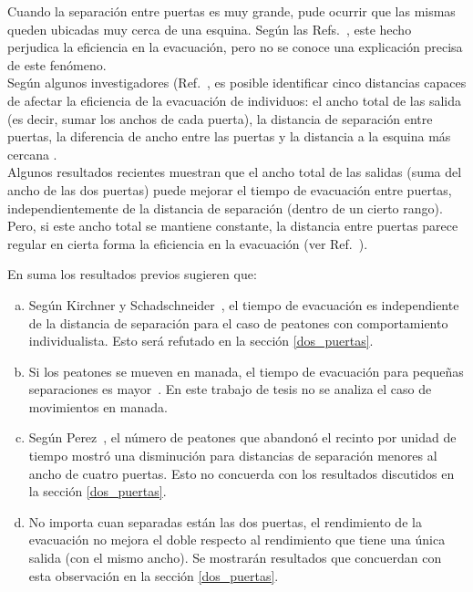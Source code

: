 Cuando la separación entre puertas es muy grande, pude ocurrir que las mismas queden ubicadas muy cerca de una esquina. Según las 
Refs.~\cite{kirchner1,daoliang1}, este hecho perjudica la eficiencia 
en la evacuación, pero no se conoce una explicación precisa de este 
fenómeno.\\

\noindent Según algunos investigadores (Ref.~\cite{huanhuan1}, es posible identificar cinco distancias capaces de afectar la eficiencia de la evacuación de individuos: el ancho total de las salida (es decir, sumar los anchos de cada puerta), la distancia de separación entre puertas, la diferencia de ancho entre las puertas y la distancia a la esquina más cercana \cite{huanhuan1}. \\

Algunos resultados recientes muestran que el ancho total de las salidas (suma del ancho de las dos puertas) puede mejorar el tiempo de evacuación entre puertas, independientemente de la distancia de separación (dentro de un cierto rango). Pero, si este ancho total se mantiene constante, la distancia entre puertas parece regular en cierta forma la eficiencia en la evacuación (ver Ref.~\cite{huanhuan1}).


En suma los resultados previos sugieren que:

\begin{enumerate}[(a)]

\item Según Kirchner y Schadschneider~\cite{kirchner1}, el tiempo de evacuación es independiente de la distancia de separación para el caso de peatones con comportamiento individualista. Esto será refutado en la sección \ref{dos_puertas}.

\item Si los peatones se mueven en manada, el tiempo de evacuación para pequeñas separaciones es mayor~\cite{kirchner1}. En este trabajo de tesis no se analiza el caso de movimientos en manada. 

\item Según Perez~\cite{perez1}, el número de peatones que abandonó el recinto por unidad de tiempo mostró una disminución para distancias de separación menores al ancho de cuatro puertas. Esto no concuerda con los resultados discutidos en la sección \ref{dos_puertas}.

\item No importa cuan separadas están las dos puertas, el rendimiento de la evacuación no mejora el doble respecto al rendimiento que tiene una única salida (con el mismo ancho). Se mostrarán resultados que concuerdan con esta observación en la sección \ref{dos_puertas}. 


\end{enumerate}


